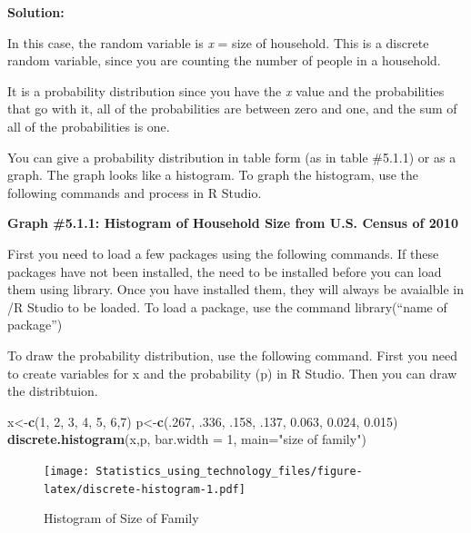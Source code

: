 \documentclass[]{book}
\newenvironment{Shaded}{\begin{snugshade}}{\end{snugshade}}
\newcommand{\DataTypeTok}[1]{\textcolor[rgb]{0.13,0.29,0.53}{#1}}
\newcommand{\DecValTok}[1]{\textcolor[rgb]{0.00,0.00,0.81}{#1}}
\newcommand{\FloatTok}[1]{\textcolor[rgb]{0.00,0.00,0.81}{#1}}
\newcommand{\KeywordTok}[1]{\textcolor[rgb]{0.13,0.29,0.53}{\textbf{#1}}}
\newcommand{\NormalTok}[1]{#1}
\newcommand{\StringTok}[1]{\textcolor[rgb]{0.31,0.60,0.02}{#1}}
\begin{document}
\textbf{Solution:}

In this case, the random variable is \emph{x} = size of household. This is a discrete random variable, since you are counting the number of people in a household.

It is a probability distribution since you have the \emph{x} value and the probabilities that go with it, all of the probabilities are between zero and one, and the sum of all of the probabilities is one.

You can give a probability distribution in table form (as in table \#5.1.1) or as a graph. The graph looks like a histogram. To graph the histogram, use the following commands and process in R Studio.

\textbf{Graph \#5.1.1: Histogram of Household Size from U.S. Census of 2010}

First you need to load a few packages using the following commands. If these packages have not been installed, the need to be installed before you can load them using library. Once you have installed them, they will always be avaialble in /R Studio to be loaded. To load a package, use the command library(``name of package'')

To draw the probability distribution, use the following command. First you need to create variables for x and the probability (p) in R Studio. Then you can draw the distribtuion.



\begin{Shaded}
\begin{Highlighting}[]
\NormalTok{x<-}\KeywordTok{c}\NormalTok{(}\DecValTok{1}\NormalTok{, }\DecValTok{2}\NormalTok{, }\DecValTok{3}\NormalTok{, }\DecValTok{4}\NormalTok{, }\DecValTok{5}\NormalTok{, }\DecValTok{6}\NormalTok{,}\DecValTok{7}\NormalTok{)}
\NormalTok{p<-}\KeywordTok{c}\NormalTok{(.}\DecValTok{267}\NormalTok{, }\FloatTok{.336}\NormalTok{, }\FloatTok{.158}\NormalTok{, }\FloatTok{.137}\NormalTok{, }\FloatTok{0.063}\NormalTok{, }\FloatTok{0.024}\NormalTok{, }\FloatTok{0.015}\NormalTok{)}
\KeywordTok{discrete.histogram}\NormalTok{(x,p, }\DataTypeTok{bar.width =} \DecValTok{1}\NormalTok{, }\DataTypeTok{main=}\StringTok{"size of family"}\NormalTok{)}
\end{Highlighting}
\end{Shaded}

\begin{figure}
\centering
\texttt{[image: Statistics\_using\_technology\_files/figure-latex/discrete-histogram-1.pdf]}
\caption{\label{fig:discrete-histogram}Histogram of Size of Family}
\end{figure}
\end{document}
